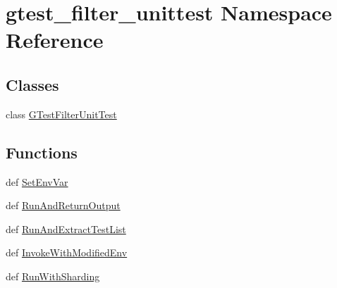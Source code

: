\hypertarget{namespacegtest__filter__unittest}{\section{gtest\-\_\-filter\-\_\-unittest Namespace Reference}
\label{namespacegtest__filter__unittest}
}
\subsection*{Classes}
\begin{DoxyCompactItemize}
\item 
class \hyperlink{classgtest__filter__unittest_1_1_g_test_filter_unit_test}{G\-Test\-Filter\-Unit\-Test}
\end{DoxyCompactItemize}
\subsection*{Functions}
\begin{DoxyCompactItemize}
\item 
def \hyperlink{namespacegtest__filter__unittest_a7f16d53c4906d45d16d3b58ceed59061}{Set\-Env\-Var}
\item 
def \hyperlink{namespacegtest__filter__unittest_a0857c50074aab02b06bd5d31a20c3800}{Run\-And\-Return\-Output}
\item 
def \hyperlink{namespacegtest__filter__unittest_ad7b84d938fa6f616b33a47ae169c66e4}{Run\-And\-Extract\-Test\-List}
\item 
def \hyperlink{namespacegtest__filter__unittest_a68f385a6abf5aca93bc6acd232e33602}{Invoke\-With\-Modified\-Env}
\item 
def \hyperlink{namespacegtest__filter__unittest_aaa465c599c34bdc805527f165ac1a832}{Run\-With\-Sharding}
\end{DoxyCompactItemize}
